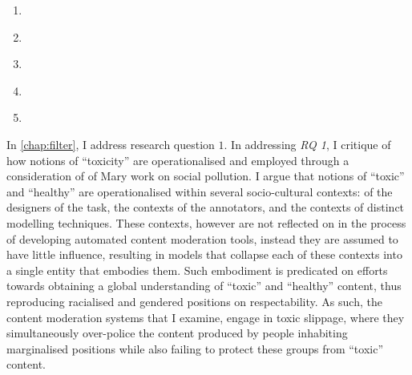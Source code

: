 \begin{center}
\begin{minipage}{0.9\textwidth}
\begin{enumerate}[start=1, label={\textbf{RQ \arabic*}}]
        \item{\textit{}}
        \item{\textit{}}
        \item{\textit{}}
        \item{\textit{}}
        \item{\textit{}}
    \end{enumerate}
    \vspace{5mm}
\end{minipage}
\end{center}

In \cref{chap:filter}, I address research question $1$.
In addressing \textit{RQ 1}, I critique of how notions of ``toxicity'' are operationalised and employed through a consideration of of Mary \citet{Douglas:1966} work on social pollution.
I argue that notions of ``toxic'' and ``healthy'' are operationalised within several socio-cultural contexts:  of the designers of the task, the contexts of the annotators, and the contexts of distinct modelling techniques.
These contexts, however are not reflected on in the process of developing automated content moderation tools, instead they are assumed to have little influence, resulting in models that collapse each of these contexts into a single entity that embodies them.
Such embodiment is predicated on efforts towards obtaining a global understanding of ``toxic'' and ``healthy'' content, thus reproducing racialised and gendered positions on respectability.
As such, the content moderation systems that I examine, engage in toxic slippage, where they simultaneously over-police the content produced by people inhabiting marginalised positions while also failing to protect these groups from ``toxic'' content.

